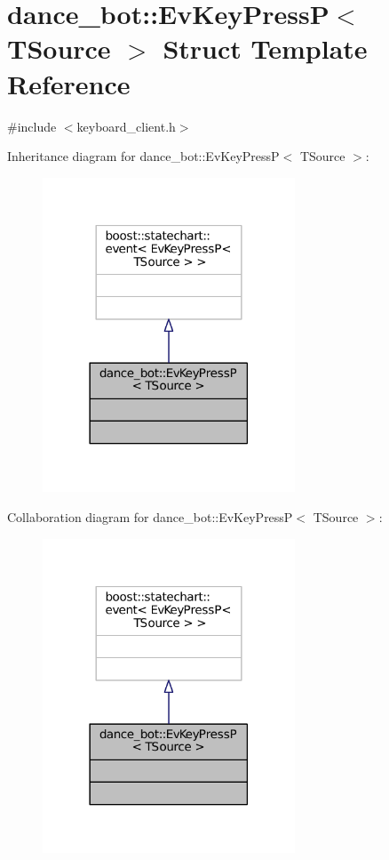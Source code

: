 \hypertarget{structdance__bot_1_1EvKeyPressP}{}\section{dance\+\_\+bot\+:\+:Ev\+Key\+PressP$<$ T\+Source $>$ Struct Template Reference}
\label{structdance__bot_1_1EvKeyPressP}


{\ttfamily \#include $<$keyboard\+\_\+client.\+h$>$}



Inheritance diagram for dance\+\_\+bot\+:\+:Ev\+Key\+PressP$<$ T\+Source $>$\+:
\nopagebreak
\begin{figure}[H]
\begin{center}
\leavevmode
\includegraphics[width=213pt]{structdance__bot_1_1EvKeyPressP__inherit__graph}
\end{center}
\end{figure}


Collaboration diagram for dance\+\_\+bot\+:\+:Ev\+Key\+PressP$<$ T\+Source $>$\+:
\nopagebreak
\begin{figure}[H]
\begin{center}
\leavevmode
\includegraphics[width=213pt]{structdance__bot_1_1EvKeyPressP__coll__graph}
\end{center}
\end{figure}



